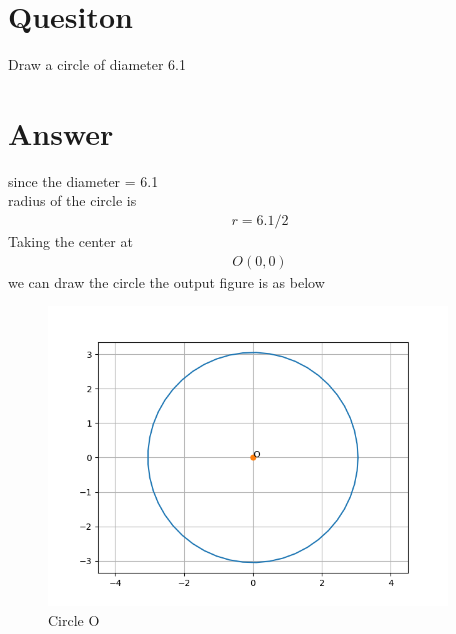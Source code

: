 \documentclass{article}
\begin{document}
\section*{Quesiton}
Draw a circle of diameter 6.1
\section*{Answer}
since the diameter = 6.1\\
radius of the circle is 
\begin{gather*}
    r = 6.1/2
\end{gather*}
Taking the center at 
\begin{gather*}
    O(0,0)
\end{gather*}
we can draw the circle
the output figure is as below
\begin{figure}[h!]
    \centering
    \includegraphics[height = 300]{Figure_2.png}
    \caption{Circle O}
    \label{fig:my_label}
\end{figure}
\end{document}
